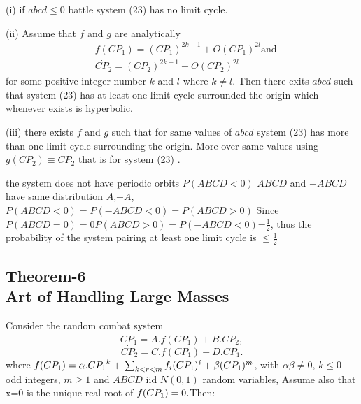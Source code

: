 \documentclass[]{article}
\begin{document}
(i) if $abcd \leq 0$ battle system (23) has no limit cycle.

(ii) Assume that $f$ and $g$ are analytically
\begin{equation}
\begin{split}
    &f(CP_1)=(CP_1)^{{2k}-1}+O(CP_1)^{2l} \text{and} \\&  \Dot{CP_2}=(CP_2)^{{2k}-1}+O(CP_2)^{2l} 
\end{split}
\end{equation}
for some positive integer number $k$ and $l$ where $k \neq l$. Then there exits $abcd$ such that system (23) has at least one limit cycle surrounded the origin which whenever exists is hyperbolic.

(iii) there exists $f$ and $g$ such that for same values of $abcd$ system (23) has more than one limit cycle surrounding the origin. More over same values using $g(CP_2)\equiv CP_2$ that is for system (23) .




the system does not have periodic orbits
$P(ABCD<0)$ $ABCD$ and $-ABCD$ have same distribution $A$,$-A$, $P(ABCD<0)=P(-ABCD<0)=P(ABCD>0)$
Since $P(ABCD=0)=0 P(ABCD>0)=P(-ABCD<0)$=$\frac{1}{2}$, thus the probability of the system pairing at least one limit cycle is $\leq\frac{1}{2}$
\newpage
\subsection{Theorem-6\\Art of Handling Large Masses}
Consider the random combat system
\begin{equation}
   \Dot{CP_1}=A.f(CP_1)+B.CP_2,
   \nonumber
\end{equation}
\begin{equation}
   \Dot{CP_2}=C.f(CP_1)+D.CP_1.
\end{equation}
where $f(CP_1)=\alpha.{CP_1}^k+\\\sum_{k<r<m}f_i(CP_1)^i+\beta(CP_1)^m$, with $\alpha\beta \neq 0$,  $k\leq 0$  odd integers, $m\geq 1$ and $ABCD$ iid $N(0,1)$ random variables, Assume also that x=0 is the unique real root of  $f(CP_1)\\=0.$Then:  
\end{document}
